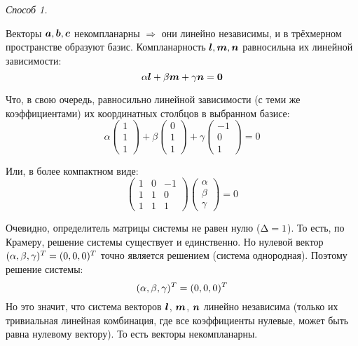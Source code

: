 \documentclass[a4paper,12pt]{article}
\begin{document}
  \begin{solution}
    \vphantom{}\par
    
    \emph{Способ 1.}
    
    \medskip
    
    Векторы $\boldsymbol a, \boldsymbol b, \boldsymbol c$ некомпланарны $\Rightarrow$ они линейно независимы, и в трёхмерном пространстве образуют базис.
    Компланарность $\boldsymbol l, \boldsymbol m, \boldsymbol n$ равносильна их линейной зависимости:
    \[
      \alpha \boldsymbol l + \beta \boldsymbol m + \gamma \boldsymbol n = \boldsymbol 0
    \]
    
    Что, в свою очередь, равносильно линейной зависимости (с теми же коэффициентами) их координатных столбцов в выбранном базисе:
    \[
      \alpha \begin{pmatrix}
        1 \\ 1 \\ 1
      \end{pmatrix}
      + \beta \begin{pmatrix}
        0 \\ 1 \\ 1
      \end{pmatrix}
      + \gamma \begin{pmatrix}
        -1 \\ 0 \\ 1
      \end{pmatrix}
      = 0
    \]
    
    Или, в более компактном виде:
    \[
      \begin{pmatrix}
        1 & 0 & -1\\
        1 & 1 & 0\\
        1 & 1 & 1
      \end{pmatrix}
      \begin{pmatrix}
        \alpha \\ \beta \\ \gamma
      \end{pmatrix}
      = 0
    \]
    
    Очевидно, определитель матрицы системы не равен нулю ($\Delta \hm= 1$).
    То есть, по Крамеру, решение системы существует и единственно.
    Но нулевой вектор $(\alpha, \beta, \gamma)^T \hm= (0, 0, 0)^T$ точно является решением (система однородная).
    Поэтому решение системы:
    \[
      (\alpha, \beta, \gamma)^T \hm= (0, 0, 0)^T
    \]
    Но это значит, что система векторов $\boldsymbol l$, $\boldsymbol m$, $\boldsymbol n$ линейно независима (только их тривиальная линейная комбинация, где все коэффициенты нулевые, может быть равна нулевому вектору).
    То есть векторы некомпланарны.
    

\end{solution}
\end{document}
